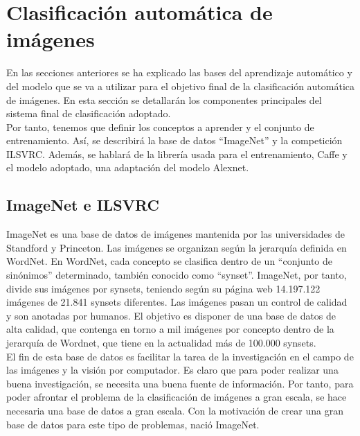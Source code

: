 \section{Clasificación automática de imágenes}

En las secciones anteriores se ha explicado las bases del aprendizaje automático y del modelo que se va a utilizar para el objetivo final de la clasificación automática de imágenes. En esta sección se detallarán los componentes principales del sistema final de clasificación adoptado.\\

Por tanto, tenemos que definir los conceptos a aprender y el conjunto de entrenamiento. Así, se describirá la base de datos ``ImageNet''\cite{imagenet_cvpr09} y la competición ILSVRC\cite{ILSVRC15}. Además, se hablará de la librería usada para el entrenamiento, Caffe \cite{jia2014caffe} y el modelo adoptado, una adaptación del modelo Alexnet\cite{NIPS2012_4824}.\\

\subsection{ImageNet e ILSVRC}

ImageNet es una base de datos de imágenes  mantenida por las universidades de Standford y Princeton. Las imágenes se organizan según la jerarquía definida en WordNet. En WordNet, cada concepto se clasifica dentro de un ``conjunto de sinónimos'' determinado, también conocido como ``synset''. ImageNet, por tanto, divide sus imágenes por synsets, teniendo según su página web 14.197.122 imágenes de 21.841 synsets diferentes. Las imágenes pasan un control de calidad y son anotadas por humanos. El objetivo es disponer de una base de datos de alta calidad, que contenga en torno a mil imágenes por concepto dentro de la jerarquía de Wordnet, que tiene en la actualidad más de 100.000 synsets.\\

El fin de esta base de datos es facilitar la tarea de la investigación en el campo de las imágenes y la visión por computador. Es claro que para poder realizar una buena investigación, se necesita una buena fuente de información. Por tanto, para poder afrontar el problema de la clasificación de imágenes a gran escala, se hace necesaria una base de datos a gran escala. Con la motivación de crear una gran base de datos para este tipo de problemas, nació ImageNet.\\

